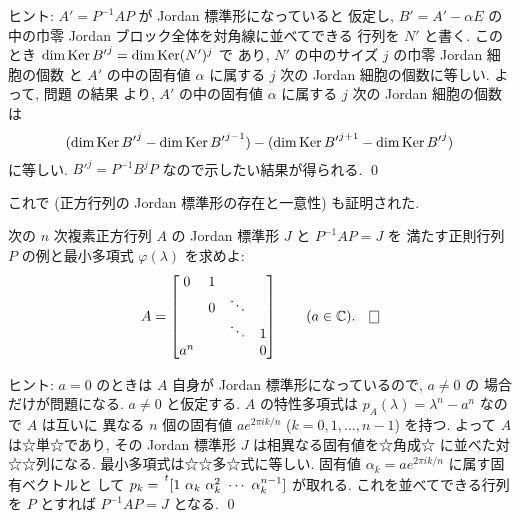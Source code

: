 \documentclass[12pt,twoside]{jarticle}
\begin{document}
\noindent
ヒント: $A' = P^{-1}AP$ が Jordan 標準形になっていると
仮定し, $B'=A'-\alpha E$ の中の巾零 Jordan ブロック全体を対角線に並べてできる
行列を $N'$ と書く.  このとき $\dim\mathop{\mathrm{Ker}}\nolimits{B'}^j = \dim\mathop{\mathrm{Ker}}\nolimits (N')^j$ で
あり,  $N'$ の中のサイズ $j$ の巾零 Jordan 細胞の個数
と $A'$ の中の固有値 $\alpha$ に属する $j$ 次の Jordan 細胞の個数に等しい.
よって, 問題  の結果
より, $A'$ の中の固有値 $\alpha$ に属する $j$ 次の Jordan 細胞の個数は
\begin{equation*}
    (\dim\mathop{\mathrm{Ker}}\nolimits{B'}^j     - \dim\mathop{\mathrm{Ker}}\nolimits{B'}^{j-1}) 
  - (\dim\mathop{\mathrm{Ker}}\nolimits{B'}^{j+1} - \dim\mathop{\mathrm{Ker}}\nolimits{B'}^j)
\end{equation*}
に等しい.  ${B'}^j = P^{-1}B^jP$ なので示したい結果が得られる.
\qed

\medskip

これで
(正方行列の Jordan 標準形の存在と一意性) も証明された.


\begin{question}
  次の $n$ 次複素正方行列 $A$ の Jordan 標準形 $J$ と $P^{-1}AP=J$ を
  満たす正則行列 $P$ の例と最小多項式 $\varphi(\lambda)$ を求めよ:
  \begin{equation*}
    A = 
    \begin{bmatrix}
      0   & 1 &        & \\
          & 0 & \ddots & \\
          &   & \ddots & 1 \\
      a^n &   &        & 0 \\
    \end{bmatrix}
    \qquad (a\in \C).
    \qed
  \end{equation*}
\end{question}

\noindent
ヒント: $a=0$ のときは $A$ 自身が Jordan 標準形になっているので, $a\ne 0$ の
場合だけが問題になる.  $a\ne 0$ と仮定する.  
$A$ の特性多項式は $p_A(\lambda)=\lambda^n - a^n$ なので $A$ は互いに
異なる $n$ 個の固有値 $a e^{2\pi ik/n}$ ($k=0,1,\ldots,n-1$) を持つ.  
よって $A$ は☆単☆であり, その Jordan 標準形 $J$ は相異なる固有値を☆角成☆
に並べた対☆☆列になる.  最小多項式は☆☆多☆式に等しい.
固有値 $\alpha_k = a e^{2\pi ik/n}$ に属す固有ベクトルと
して $p_k = \tp{[1\ \alpha_k\ \alpha_k^2\ \cdots\ \alpha_k^{n-1}]}$ が取れる.
これを並べてできる行列を $P$ とすれば $P^{-1}AP=J$ となる.
\qed

\end{document}
